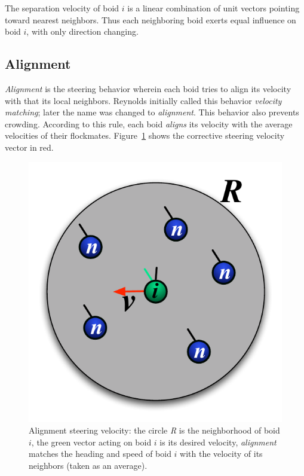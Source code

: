 The separation velocity of boid $i$ is a linear combination of unit vectors pointing toward nearest neighbors. Thus each neighboring boid exerts equal influence on boid $i$, with only direction changing. 

\subsection{Alignment}
\textit{Alignment} is the steering behavior wherein each boid tries to align its velocity with that its local neighbors. Reynolds initially called this behavior \textit{velocity matching}; later the name was changed to \textit{alignment}. This behavior also prevents crowding. According to this rule, each boid \textit{aligns} its velocity with the average velocities of their flockmates. Figure~\ref{alignmentPDF} shows the corrective steering velocity vector in red.

\begin{figure}[htbp]
\vspace{16pt}
\begin{center}
\includegraphics[scale=0.85]{figures/alignment.pdf}
\caption{Alignment steering velocity: the circle \textit{R} is the neighborhood of boid $i$, the green vector acting on boid $i$ is its desired velocity, \textit{alignment} matches the heading and speed of boid $i$ with the velocity of its neighbors (taken as an average).}
\label{alignmentPDF}
\end{center}
\end{figure}

